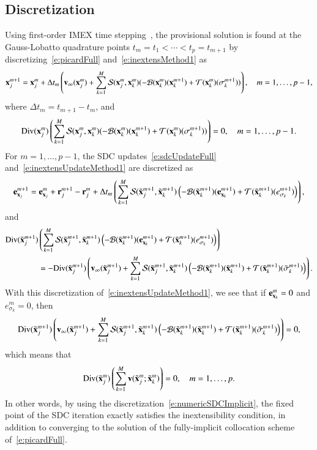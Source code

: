 \subsection{Discretization}
Using first-order IMEX time stepping~\cite{qua:bir2014b}, the
provisional solution is found at the Gauss-Lobatto quadrature points
$t_{m} = t_{1} < \cdots < t_{p} = t_{m+1}$ by
discretizing~\eqref{e:picardFull} and~\eqref{e:inextensMethod1} as
\begin{align*}
  {\mathbf{x}}_{j}^{m+1} = {\mathbf{x}}_{j}^{m} + \Delta t_{m}
    \left({\mathbf{v}}_{\infty}({\mathbf{x}}^{m}_{j}) + 
    \sum_{k=1}^{M} {\mathcal{S}}({\mathbf{x}}^{m}_{j},{\mathbf{x}}^{m}_{k})(
    -{\mathcal{B}}({\mathbf{x}}^{m}_{k})({\mathbf{x}}^{m+1}_{k}) +
    {\mathcal{T}}({\mathbf{x}}^{m}_{k})(\sigma^{m+1}_{k}))\right), \quad m = 1,\ldots,p-1,
\end{align*}
where $\Delta t_{m} = t_{m+1} - t_{m}$, and
\begin{align*}
  \mathrm{Div}({\mathbf{x}}^{m}_{j})\left(\sum_{k=1}^{M} {\mathcal{S}}({\mathbf{x}}^{m}_{j},{\mathbf{x}}^{m}_{k})(
    -{\mathcal{B}}({\mathbf{x}}^{m}_{k})({\mathbf{x}}^{m+1}_{k}) +
    {\mathcal{T}}({\mathbf{x}}^{m}_{k})(\sigma^{m+1}_{k}))\right)=0, \quad m = 1,\ldots,p-1.
\end{align*}
For $m=1,\ldots,p-1$, the SDC updates~\eqref{e:sdcUpdateFull}
and~\eqref{e:inextensUpdateMethod1} are discretized as
\begin{align*}
  {\mathbf{e}}^{m+1}_{{\mathbf{x}}_{j}} = {\mathbf{e}}^{m}_{{\mathbf{x}}_{j}} + 
  {\mathbf{r}}_{j}^{m+1} - {\mathbf{r}}_{j}^{m}
  +\Delta t_{m} \left(\sum_{k=1}^{M} 
    {\mathcal{S}}({\tilde{{\mathbf{x}}}_{j}}^{m+1},{\tilde{{\mathbf{x}}}_{k}}^{m+1})\left(
    -{\mathcal{B}}({\tilde{{\mathbf{x}}}_{k}}^{m+1})({\mathbf{e}}^{m+1}_{{\mathbf{x}}_{k}}) +
    {\mathcal{T}}({\tilde{{\mathbf{x}}}_{k}}^{m+1})(e^{m+1}_{\sigma_{k}})
    \right)\right),
\end{align*}
and
\begin{align*}
  \mathrm{Div}({\tilde{{\mathbf{x}}}_{j}}^{m+1})&\left(\sum_{k=1}^{M} 
    {\mathcal{S}}({\tilde{{\mathbf{x}}}_{j}}^{m+1},{\tilde{{\mathbf{x}}}_{k}}^{m+1})\left(
    -{\mathcal{B}}({\tilde{{\mathbf{x}}}_{k}}^{m+1})({\mathbf{e}}^{m+1}_{{\mathbf{x}}_{k}}) +
    {\mathcal{T}}({\tilde{{\mathbf{x}}}_{k}}^{m+1})(e^{m+1}_{\sigma_{k}})
    \right)\right) \\
  &=-\mathrm{Div}({\tilde{{\mathbf{x}}}_{j}}^{m+1})\left({\mathbf{v}}_{\infty}({\tilde{{\mathbf{x}}}_{j}}^{m+1})
    +\sum_{k=1}^{M} {\mathcal{S}}({\tilde{{\mathbf{x}}}_{j}}^{m+1},{\tilde{{\mathbf{x}}}_{k}}^{m+1})\left(
    -{\mathcal{B}}({\tilde{{\mathbf{x}}}_{k}}^{m+1})({\tilde{{\mathbf{x}}}_{k}}^{m+1}) + 
    {\mathcal{T}}({\tilde{{\mathbf{x}}}_{k}}^{m+1})({\tilde{\sigma}_{k}}^{m+1})\right)\right).
\end{align*}
With this discretization of~\eqref{e:inextensUpdateMethod1}, we see
that if ${\mathbf{e}}^{m}_{{\mathbf{x}}_{k}}=0$ and $e^{m}_{\sigma_{k}}=0$, then
\begin{align*}
  \mathrm{Div}({\tilde{{\mathbf{x}}}_{j}}^{m+1})\left({\mathbf{v}}_{\infty}({\tilde{{\mathbf{x}}}_{j}}^{m+1})
    +\sum_{k=1}^{M} {\mathcal{S}}({\tilde{{\mathbf{x}}}_{j}}^{m+1},{\tilde{{\mathbf{x}}}_{k}}^{m+1})\left(
    -{\mathcal{B}}({\tilde{{\mathbf{x}}}_{k}}^{m+1})({\tilde{{\mathbf{x}}}_{k}}^{m+1}) + 
    {\mathcal{T}}({\tilde{{\mathbf{x}}}_{k}}^{m+1})({\tilde{\sigma}_{k}}^{m+1})\right)\right) = 0, 
\end{align*}
which means that
\begin{align*}
  \mathrm{Div}({\tilde{{\mathbf{x}}}_{j}}^{m})\left( \sum_{k=1}^{M}
    {\mathbf{v}}({\tilde{{\mathbf{x}}}_{j}}^{m};{\tilde{{\mathbf{x}}}_{k}}^{m})\right) = 0, \quad m = 1,\ldots,p.
\end{align*}
In other words, by using the
discretization~\eqref{e:numericSDCImplicit}, the fixed point of the SDC
iteration exactly satisfies the inextensibility condition, in addition
to converging to the solution of the fully-implicit collocation scheme
of~\eqref{e:picardFull}.

